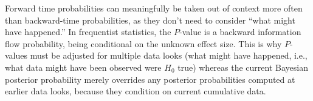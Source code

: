Forward time probabilities can meaningfully be
taken out of context more often than backward-time probabilities, as
they don't need to consider ``what might have happened.''  In
frequentist statistics, the $P$-value is a backward information flow
probability, being conditional on the unknown effect size.  This is
why $P$-values must be adjusted for multiple data looks (what might
have happened, i.e., what data might have been observed were $H_{0}$
true) whereas the current Bayesian posterior probability 
merely overrides any posterior probabilities computed at earlier data
looks, because they condition on current cumulative data.
